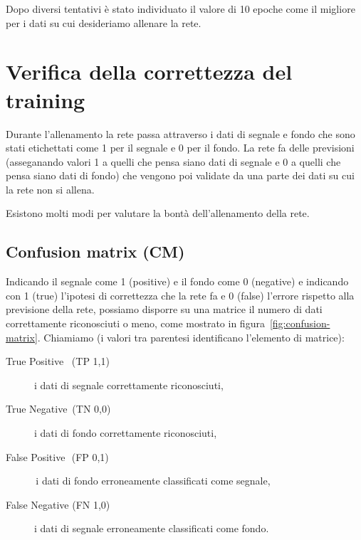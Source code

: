     Dopo diversi tentativi è stato individuato il valore di 10 epoche come il migliore per i dati su cui desideriamo allenare la rete.

\newpage

\section{Verifica della correttezza del training}
    Durante l'allenamento la rete passa attraverso i dati di segnale e fondo che sono stati etichettati come 1 per il segnale e 0 per il fondo. La rete fa delle previsioni (asseganando valori 1 a quelli che pensa siano dati di segnale e 0 a quelli che pensa siano dati di fondo) che vengono poi validate da una parte dei dati su cui la rete non si allena.
    
    Esistono molti modi per valutare la bontà dell'allenamento della rete.

    \subsection{Confusion matrix (CM)}
        Indicando il segnale come 1 (positive) e il fondo come 0 (negative) e indicando con 1 (true) l'ipotesi di correttezza che la rete fa e 0 (false) l'errore rispetto alla previsione della rete, possiamo disporre su una matrice il numero di dati correttamente riconosciuti o meno, come mostrato in figura~\ref{fig:confusion-matrix}. Chiamiamo (i valori tra parentesi identificano l'elemento di matrice):
        \begin{description}
            \item[True Positive \,\,\,(TP 1,1)] i dati di segnale correttamente riconosciuti,

            \item[True Negative \,(TN 0,0)] i dati di fondo correttamente riconosciuti,

            \item[False Positive \,\,(FP 0,1)] \,i dati di fondo erroneamente classificati come segnale,

            \item[False Negative (FN 1,0)] i dati di segnale erroneamente classificati come fondo.
        \end{description}
         
